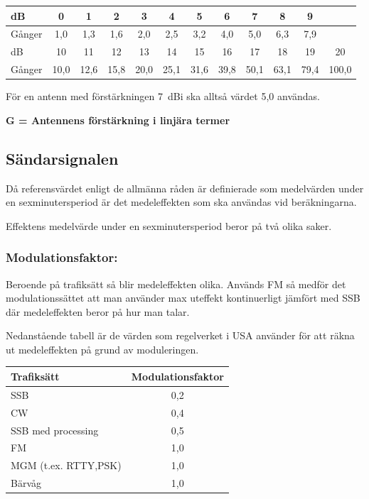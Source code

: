 \begin{tabular}{|l|ccccccccccc|}
\hline
dB     &  0  &  1  &  2  &  3  &  4  &  5  &  6  &  7  &  8  &  9  & \\ \hline
Gånger & 1,0 & 1,3 & 1,6 & 2,0 & 2,5 & 3,2 & 4,0 & 5,0 & 6,3 & 7,9 & \\ \hline
dB     &  10  &  11  &  12  &  13  &  14  &  15  &  16  &  17  &  18  &  19  &  20 \\ \hline
Gånger & 10,0 & 12,6 & 15,8 & 20,0 & 25,1 & 31,6 & 39,8 & 50,1 & 63,1 & 79,4 & 100,0 \\ \hline
\end{tabular}

För en antenn med förstärkningen 7~dBi ska alltså värdet 5,0 användas.

\textbf{G = Antennens förstärkning i linjära termer}

\subsection{Sändarsignalen}

Då referensvärdet enligt de allmänna råden är definierade som
medelvärden under en sexminutersperiod är det medeleffekten som ska
användas vid beräkningarna.

Effektens medelvärde under en sexminutersperiod beror på två olika saker.

\subsubsection{Modulationsfaktor:}

Beroende på trafiksätt så blir medeleffekten olika. Används FM så medför
det modulationssättet att man använder max uteffekt kontinuerligt
jämfört med SSB där medeleffekten beror på hur man talar.

Nedanstående tabell är de värden som regelverket i USA använder för
att räkna ut medeleffekten på grund av moduleringen.

\begin{tabular}{|l|c|}
\hline
Trafiksätt & Modulationsfaktor \\ \hline
SSB & 0,2 \\ \hline
CW & 0,4 \\ \hline
SSB med processing & 0,5 \\ \hline
FM & 1,0 \\ \hline
MGM (t.ex. RTTY,PSK) & 1,0 \\ \hline
Bärvåg & 1,0 \\ \hline
\end{tabular}

